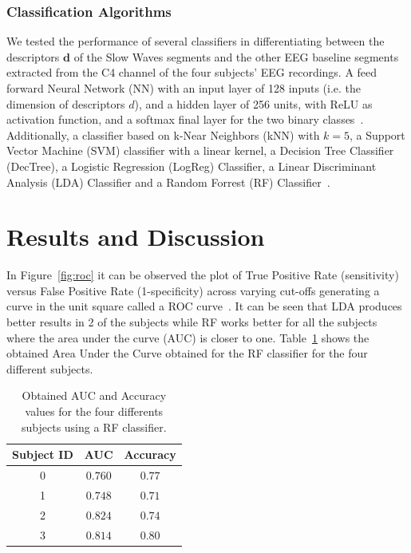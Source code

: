 \documentclass[review]{elsarticle}
\begin{document}
\subsubsection{Classification Algorithms}
\label{classifalgorithms}

We tested the performance of several classifiers in differentiating between the descriptors $\mathbf{d}$ of the Slow Waves segments and the other EEG baseline segments extracted from the C4 channel of the four subjects' EEG recordings.  A feed forward Neural Network (NN) with an input layer of 128 inputs (i.e. the dimension of descriptors $d$), and a hidden layer of 256 units, with ReLU as activation function, and a softmax final layer for the two binary classes~\cite{gong2020deep}.  Additionally, a classifier based on k-Near Neighbors (kNN) with $k=5$, a Support Vector Machine (SVM) classifier with a linear kernel, a Decision Tree Classifier (DecTree), a Logistic Regression (LogReg) Classifier, a Linear Discriminant Analysis (LDA) Classifier and a Random Forrest (RF) Classifier~\cite{Lotte2018}.

\section{Results and Discussion}
\label{results}

In Figure~\ref{fig:roc} it can be observed the plot of True Positive Rate (sensitivity) versus False Positive Rate (1-specificity) across varying cut-offs generating a curve in the unit square called a ROC curve~\cite{Fawcett2005}.   It can be seen that LDA produces better results in 2 of the subjects while RF works better for all the subjects where the area under the curve (AUC) is closer to one.  Table~\ref{tablesubjects} shows the obtained Area Under the Curve obtained for the RF classifier for the four different subjects.

\begin{table}[htb]
\caption{Obtained AUC and Accuracy values for the four differents subjects using a RF classifier.}
\centering
\vspace{8pt}
\begin{tabular}{|c|c|c|}
\toprule
Subject ID	&   AUC & Accuracy  \\
\midrule
0     &     $0.760$  & $0.77$  \\
1    &     $0.748$    & $0.71$  \\
2     &     $0.824$   & $0.74$  \\
3     &     $0.814$    & $0.80$ \\
\bottomrule
\end{tabular}
\label{tablesubjects}
\end{table}
\end{document}
